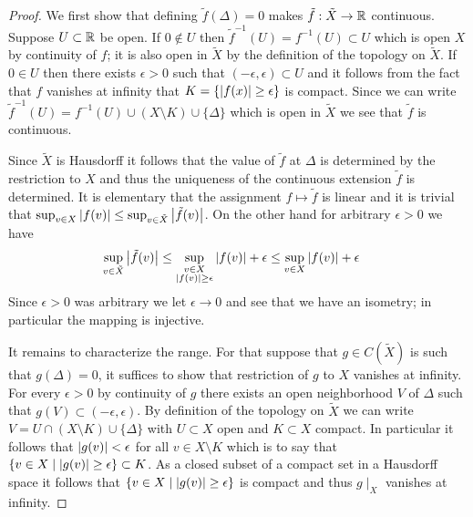 \begin{proof}
We first show that defining $\tilde{f}(\Delta) =0$ makes $\tilde{f} : \tilde{X} \to \mathbb{R}$ continuous.  Suppose $U \subset \mathbb{R}$ be open.  If $0 \notin U$ then
$\tilde{f}^{-1}(U) = f^{-1}(U) \subset U$ which is open $X$ by continuity of $f$; it is also open  in $\tilde{X}$ by the definition of the topology on $\tilde{X}$.  If $0 \in U$ then
there exists $\epsilon > 0$ such that $(-\epsilon, \epsilon) \subset U$ and it follows from the fact that $f$ vanishes at infinity that $K = \lbrace \left \vert f(x) \right \vert \geq \epsilon \rbrace$ is
compact.  Since we can write $\tilde{f}^{-1}(U) = f^{-1}(U) \cup (X \setminus K) \cup \lbrace \Delta \rbrace$ which is open in $\tilde{X}$ we see that $\tilde{f}$ is continuous.

Since $\tilde{X}$ is Hausdorff it follows that the value of $\tilde{f}$ at $\Delta$ is determined by the restriction to $X$ and thus the uniqueness of the continuous extension $\tilde{f}$ is determined.  It is elementary that the assignment $f \mapsto \tilde{f}$ is linear and it is trivial that $\sup_{v \in X} \left \vert f(v) \right \vert \leq \sup_{v \in \tilde{X}} \left \vert \tilde{f}(v) \right \vert$.  On the other hand for arbitrary $\epsilon > 0$ we have 
\begin{align*}
\sup_{v \in \tilde{X}} \left \vert \tilde{f}(v) \right \vert &\leq \sup_{\substack{v \in X \\ \left \vert f(v) \right \vert \geq \epsilon}} \left \vert f(v) \right \vert + \epsilon \leq \sup_{v \in X} \left \vert f(v) \right \vert + \epsilon
\end{align*}
Since $\epsilon>0$ was arbitrary we let $\epsilon \to 0$ and see that we have an isometry; in particular the mapping is injective.

It remains to characterize the range.  For that suppose that $g \in C(\tilde{X})$ is such that $g(\Delta) = 0$, it suffices to show that restriction of $g$ to $X$ vanishes at infinity.
For every $\epsilon > 0$ by continuity of $g$ there exists an open neighborhood $V$ of $\Delta$ such that $g(V) \subset (-\epsilon, \epsilon)$.  By definition of the topology on $\tilde{X}$ we can write $V = U \cap (X \setminus K) \cup \lbrace \Delta \rbrace$ with $U \subset X$ open and $K \subset X$ compact.  In particular it follows that $\left \vert g(v) \right \vert < \epsilon$ for all $v \in X \setminus K$ which is to say that $\lbrace v \in X \mid \left \vert g(v) \right \vert \geq \epsilon \rbrace \subset K$.  As a closed subset of a compact set in a Hausdorff space it follows that $\lbrace v \in X \mid \left \vert g(v) \right \vert \geq \epsilon \rbrace$ is compact and thus $g \mid_X$ vanishes at infinity.
\end{proof}

